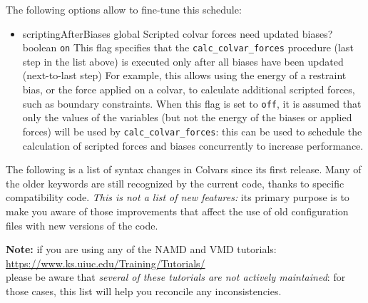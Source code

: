 {The following options allow to fine-tune this schedule:
\begin{itemize}
\item %
  \keydef
    {scriptingAfterBiases}{%
    global}{%
    Scripted colvar forces need updated biases?}{%
    boolean}{%
    \texttt{on}}{%
    This flag specifies that the \texttt{calc\_colvar\_forces} procedure (last step in the list above) is executed only after all biases have been updated (next-to-last step)
    For example, this allows using the energy of a restraint bias, or the force applied on a colvar,
    to calculate additional scripted forces, such as boundary constraints.
    When this flag is set to \texttt{off}, it is assumed that only the values of the variables
    (but not the energy of the biases or applied forces) will be used by \texttt{calc\_colvar\_forces}:
    this can be used to schedule the calculation of scripted forces and biases concurrently
    to increase performance.}
\end{itemize}

}\fi %


\ifdefined{}\fi





The following is a list of syntax changes in Colvars since its first release.
Many of the older keywords are still recognized by the current code, thanks to specific compatibility code.
\emph{This is not a list of new features:} its primary purpose is to make you aware of those improvements that affect the use of old configuration files with new versions of the code.

\noindent\textbf{Note:} if you are using any of the NAMD and VMD tutorials:\\
\url{https://www.ks.uiuc.edu/Training/Tutorials/}\\
please be aware that \emph{several of these tutorials are not actively maintained}: for those cases, this list will help you reconcile any inconsistencies.

